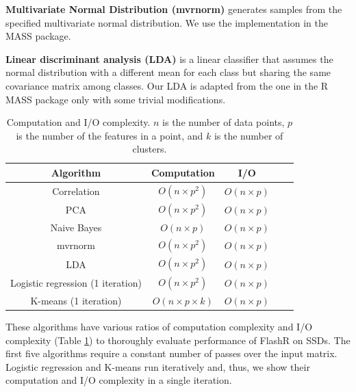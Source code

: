\noindent \textbf{Multivariate Normal Distribution (mvrnorm)} generates
samples from the specified multivariate normal distribution. We use
the implementation in the MASS package.

\noindent \textbf{Linear discriminant analysis (LDA)} is a linear classifier
that assumes the normal distribution with a different mean for each class
but sharing the same covariance matrix among classes. Our LDA is adapted from
the one in the R MASS package only with some trivial modifications.

\begin{table}
\begin{center}
\footnotesize
\begin{tabular}{|c|c|c|c|c|}
\hline
Algorithm & Computation & I/O \\
\hline
Correlation & $O(n \times p^2)$ & $O(n \times p)$ \\
\hline
PCA & $O(n \times p^2)$ & $O(n \times p)$ \\
\hline
Naive Bayes & $O(n \times p)$ & $O(n \times p)$ \\
\hline
mvrnorm & $O(n \times p^2)$ & $O(n \times p)$ \\
\hline
LDA & $O(n \times p^2)$ & $O(n \times p)$ \\
\hline
Logistic regression  (1 iteration) & $O(n \times p^2)$ & $O(n \times p)$ \\
\hline
K-means (1 iteration) & $O(n \times p \times k)$ & $O(n \times p)$ \\
\hline
\end{tabular}
\normalsize
\end{center}
\caption{Computation and I/O complexity. $n$ is the number of data points, $p$
is the number of the features in a point, and $k$ is the number of clusters.
	}
\label{tbl:algs}
\end{table}

These algorithms have various ratios of computation complexity and I/O complexity
(Table \ref{tbl:algs}) to thoroughly evaluate performance of FlashR on SSDs.
The first five algorithms require a constant number of passes over the input
matrix. Logistic regression and K-means run iteratively and, thus, we show
their computation and I/O complexity in a single iteration.


